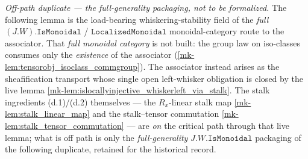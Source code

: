 \emph{Off-path duplicate --- the full-generality packaging, not to be formalized.}
The following lemma is the load-bearing whiskering-stability field of the \emph{full}
\((J.W).\mathtt{IsMonoidal}\) / \(\mathtt{LocalizedMonoidal}\) monoidal-category route
to the associator. That \emph{full monoidal category} is not built: the group law on
iso-classes consumes only the \emph{existence} of the associator
(\ref{mk-lem:tensorobj_isoclass_commgroup}). The associator instead arises as the
sheafification transport whose single open left-whisker obligation is closed by the
live lemma \ref{mk-lem:islocallyinjective_whiskerleft_via_stalk}. The stalk ingredients
(d.1)/(d.2) themselves --- the \(R_x\)-linear stalk map \ref{mk-lem:stalk_linear_map}
and the stalk--tensor commutation \ref{mk-lem:stalk_tensor_commutation} --- are
\emph{on} the critical path through that live lemma; what is off path is only the
\emph{full-generality} \(J.W.\mathtt{IsMonoidal}\) packaging of the following
duplicate, retained for the historical record.

